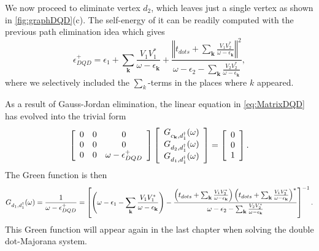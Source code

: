 We now proceed to eliminate vertex $d_2$, which leaves just a single vertex as  shown in \ref{fig:graphDQD}(c). The self-energy of it can be readily computed with the previous path elimination idea which gives 
\begin{equation}
    \epsilon^+_{DQD}=\epsilon_{1}+\sum_{\mathbf{k}}\frac{V_{1}V_{1}^{*}}{\omega-\epsilon_{\mathbf{k}}}+\frac{\left\Vert t_{dots}+\sum_{\mathbf{k}}\frac{V_{1}V_{2}^{*}}{\omega-\epsilon_{\mathbf{k}}}\right\Vert ^{2}}{\omega-\epsilon_{2}-\sum_{\mathbf{k}}\frac{V_{2}V_{2}^{*}}{\omega-\epsilon_{\mathbf{k}}}},  \label{eq:EnDQD}
\end{equation}
\noindent where we selectively included the $\sum_k$-terms in the places where $k$ appeared. 

As a result of  Gauss-Jordan elimination, the linear equation in \eqref{eq:MatrixDQD} has evolved into the trivial form 
\begin{equation}
\left[\begin{array}{ccc}
0 & 0 & 0\\
0 & 0 & 0\\
0 & 0 & \omega-\epsilon_{DQD}^{+}
\end{array}\right]\left[\begin{array}{c}
G_{c_{\mathbf{k}},d_{1}^{\dagger}}(\omega)\\
G_{d_{2},d_{1}^{\dagger}}(\omega)\\
G_{d_{1},d_{1}^{\dagger}}(\omega)
\end{array}\right]=\left[\begin{array}{c}
0\\
0\\
1
\end{array}\right].
\end{equation}
The Green function is then 
\begin{align}
G_{d_{1},d_{1}^{\dagger}}(\omega)=\frac{1}{\omega -  \epsilon^+_{DQD}} =\left[\left(\omega-\epsilon_{1}-\sum_{\mathbf{k}}\frac{V_{1}V_{1}^{*}}{\omega-\epsilon_{\mathbf{k}}}\right)-\frac{\left(t_{dots}+\sum_{\mathbf{k}}\frac{V_{1}V_{2}^{*}}{\omega-\epsilon_{\mathbf{k}}}\right)\left(t_{dots}+\sum_{\mathbf{k}}\frac{V_{1}V_{2}^{*}}{\omega-\epsilon_{\mathbf{k}}}\right)^{*}}{\omega-\epsilon_{2}-\sum_{\mathbf{k}}\frac{V_2V_{2}^{*}}{\omega-\epsilon_{\mathbf{k}}}}\right]^{-1}. \label{eq:SumSolGreen} 
\end{align}
\noindent This Green function will appear again in the last chapter when solving the double dot-Majorana system.    

